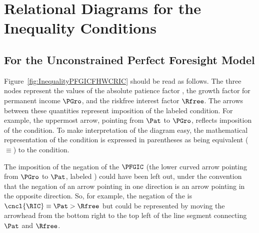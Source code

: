 \documentclass[\econtexRoot/BufferStockTheory]{subfiles}
\begin{document}
\label{sec:ApndxConditionDiagrams}
\hypertarget{ApndxConditionDiagrams}{}
\section{Relational Diagrams for the Inequality Conditions}

\subsection{For the Unconstrained Perfect Foresight Model}

\providecommand{\figName}{InequalityPFGICFHWCRIC}
\providecommand{\figFile}{\figName}
\hypertarget{\figFile}{}
\hypertarget{\figName}{}


Figure~\ref{fig:InequalityPFGICFHWCRIC} should be read as follows.  The three nodes represent the values of the absolute patience factor \Thorn, the growth factor for permanent income $\PGro$, and the riskfree interest factor $\Rfree$.  The arrows between these quantities represent imposition of the labeled condition.  For example, the uppermost arrow, pointing from {$\Pat$} to $\PGro$, reflects imposition of the {\PFGIC} condition.  To make interpretation of the diagram easy, the mathematical representation of the condition is expressed in parentheses as being equivalent ($\equiv$) to the condition.

The imposition of the negation of the $\PFGIC$ (the lower curved arrow pointing from $\PGro$ to {$\Pat$}, labeled \cncl{\PFGIC}) could have been left out, under the convention that the negation of an arrow pointing in one direction is an arrow pointing in the opposite direction.  So, for example, the negation of the {\RIC} is $\cncl{\RIC} \equiv \Pat > \Rfree$ but could be represented by moving the arrowhead from the bottom right to the top left of the line segment connecting {$\Pat$} and $\Rfree$.
\end{document}
